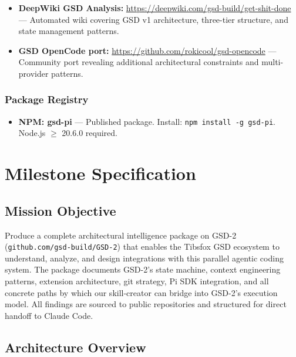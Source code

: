 \documentclass[11pt,letterpaper]{article}
\newcommand{\stageheader}[2]{%
  \noindent\colorbox{#2}{\makebox[\textwidth][l]{%
    \textcolor{white}{\bfseries\sffamily\hspace{6pt}#1\hspace{6pt}}}}%
  \vspace{0.5em}\par%
}
\begin{document}
\begin{itemize}
  \item \textbf{DeepWiki GSD Analysis:} \url{https://deepwiki.com/gsd-build/get-shit-done} --- Automated wiki covering GSD v1 architecture, three-tier structure, and state management patterns.
  \item \textbf{GSD OpenCode port:} \url{https://github.com/rokicool/gsd-opencode} --- Community port revealing additional architectural constraints and multi-provider patterns.
\end{itemize}

\subsubsection{Package Registry}

\begin{itemize}
  \item \textbf{NPM: gsd-pi} --- Published package. Install: \texttt{npm install -g gsd-pi}. Node.js $\geq$ 20.6.0 required.
\end{itemize}

\newpage

\stageheader{STAGE 3 --- MISSION PACKAGE}{tertiary}

\section{Milestone Specification}

\subsection{Mission Objective}

Produce a complete architectural intelligence package on GSD-2 (\texttt{github.com/gsd-build/GSD-2}) that enables the Tibsfox GSD ecosystem to understand, analyze, and design integrations with this parallel agentic coding system. The package documents GSD-2's state machine, context engineering patterns, extension architecture, git strategy, Pi SDK integration, and all concrete paths by which our skill-creator can bridge into GSD-2's execution model. All findings are sourced to public repositories and structured for direct handoff to Claude Code.

\subsection{Architecture Overview}
\end{document}
